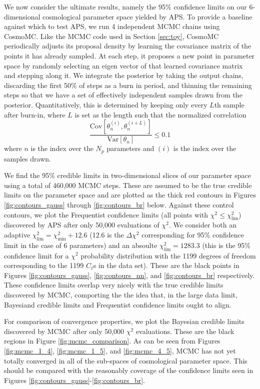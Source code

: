 \documentclass[useAMS,usenatbib]{aastex}
\begin{document}
We now consider the ultimate results, namely the 95\% confidence limits on
our 6-dimensional cosmological parameter space yielded by APS.
To provide a baseline against which to test APS, we run 4 independent MCMC
chains using CosmoMC.  Like the MCMC code used in Section \ref{sec:toy},
CosmoMC periodically adjusts its proposal density by learning the covariance
matrix of the points it has already sampled.  At each step, it proposes
a new point in parameter space by randomly selecting an eigen vector
of that learned covariance matrix and stepping along it.
We integrate the posterior by taking the output chains, discarding the first
50\% of steps as a burn in period, and thinning the remaining steps so that
we have a set of effectively independent samples drawn from the posterior.
Quantitatively, this is determined by keeping only every $L$th sample after
burn-in, where $L$ is set as the length such that the normalized correlation
\begin{equation}
\frac{\text{Cov}[\theta_n^{(i)},\theta_n^{(i+L)}]}
{\text{Var}[\theta_n]}\le 0.1
\end{equation}
where $n$ is the index over the $N_p$ parameters and $(i)$ is the index
over the samples drawn.

We find the 95\% credible
limits in two-dimensional slices of our parameter space using
a total of 460,000 MCMC steps.  These are assumed to be the
true credible limits on the parameter space and are plotted
as the thick red
contours in Figures \ref{fig:contours_gauss} through 
\ref{fig:contours_br} 
below.  Against these control contours, we plot the Frequentist
confidence limits (all points with $\chi^2\le\chi^2_\text{lim}$)
discovered by APS after only 50,000 evaluations of $\chi^2$.
We consider both an adaptive $\chi^2_\text{lim}=\chi^2_\text{min}+12.6$
(12.6 is the $\Delta\chi^2$ corresponding for 95\% confidence limit in the case
of 6 parameters)
and an absoulte $\chi^2_\text{lim}=1283.3$ (this is the 95\% confidence limit
for a $\chi^2$ probability distribution with the 1199 degrees of freedom corresponding
to the 1199 $C_\ell$s in the data set).
These are the black points in Figures \ref{fig:contours_gauss}, \ref{fig:contours_nn},
and \ref{fig:contours_br} respectively.  These confidence limits overlap very nicely
with the true credible limits discovered by MCMC,
comporting the the idea that, in the large data limit, Bayesiand credible limits
and Frequentist confidence limits ought to align.

For comparison of convergence properties, we plot the Bayesian credible limits discovered
by MCMC after only 50,000 $\chi^2$ evaluations.  These are the black regions in
Figure \ref{fig:mcmc_comparison}.  As can be seen from Figures \ref{fig:mcmc_1_4},
\ref{fig:mcmc_1_5}, and \ref{fig:mcmc_4_5}, MCMC has not yet totally converged
in all of the sub-spaces of cosmological parameter space.  This should be compared
with the reasonably coverage of the confidence limits seen in
Figures \ref{fig:contours_gauss}-\ref{fig:contours_br}.
\end{document}
